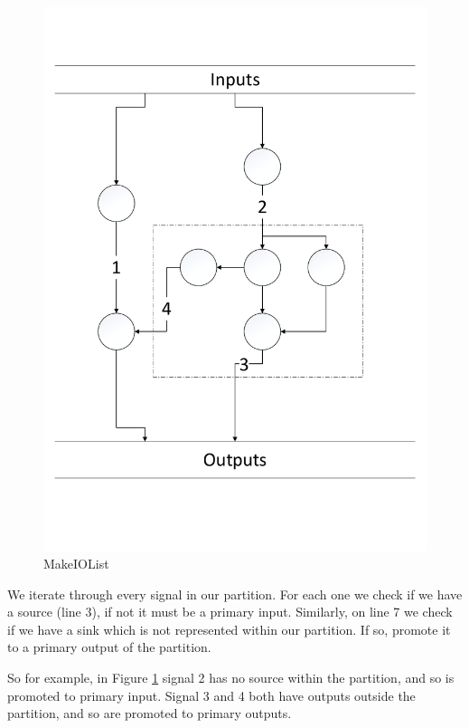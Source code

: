 \documentclass[12pt,final,oneside,a4paper]{dwThesis} %
\begin{document}
   \begin{figure}

      \begin{center}

         \includegraphics[width=\linewidth]{images/MakeIOList.pdf}
         \caption{MakeIOList} \label{imMakeiolist} 
      \end{center}

   \end{figure}
   We
   iterate through every signal in our partition. For each one we check if we
   have a source (line 3), if not it must be a primary input. Similarly, on
   line 7 we check if we have a sink which is not represented within our
   partition. If so, promote it to a primary output of the partition.

   So for example, in Figure \ref{imMakeiolist} signal 2 has no source within
   the partition, and so is promoted to primary input. Signal 3 and 4 both have
   outputs outside the partition, and so are promoted to primary outputs.
\end{document}
